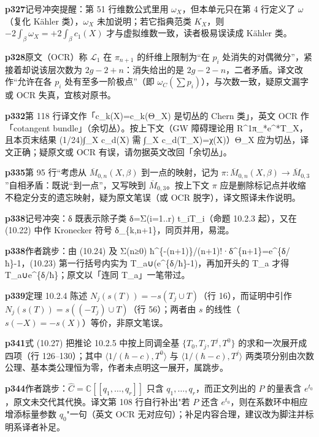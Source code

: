 \noindent\textbf{\footnotesize p327}\quad 记号冲突提醒：第 51 行维数公式里用 $\omega_X$，但本单元只在第 4 行定义了 $\omega$（复化 Kähler 类），$\omega_X$ 未加说明；若它指典范类 $K_X$，则 $-2\int_\beta\omega_X=+2\int_\beta c_1(X)$ 才与虚拟维数一致，读者极易误读成 Kähler 类。

\noindent\textbf{\footnotesize p328}\quad 原文（OCR）称 $\mathcal L_1$ 在 $\pi_{n+1}$ 的纤维上限制为“在 $p_i$ 处消失的对偶微分”，紧接着却说该层次数为 $2g-2+n$：消失给出的是 $2g-2-n$，二者矛盾。译文改作“允许在各 $p_i$ 处有至多一阶极点”（即 $\omega_C(\sum p_i)$），与次数一致，疑原文漏字或 OCR 失真，宜核对原书。

\noindent\textbf{\footnotesize p332}\quad 第 118 行译文作「c\_k(X)=c\_k(Θ\_X) 是切丛的 Chern 类」，英文 OCR 作「cotangent bundle」（余切丛）。按上下文（GW 障碍理论用 R\^{}1π\_*e\^{}*T\_X，且本页末结果 (1/24)∫\_X c\_d(X) 需 ∫\_X c\_d(T\_X)=χ(X)）Θ\_X 应为切丛，译文正确；疑原文或 OCR 有误，请勿据英文改回「余切丛」。

\noindent\textbf{\footnotesize p335}\quad 第 95 行“考虑从 $\overline M_{0,n}(X,\beta)$ 到一点的映射，记为 $\pi:\overline M_{0,n}(X,\beta)\to\overline M_{0,3}$”自相矛盾：既说“到一点”，又写映到 $\overline M_{0,3}$。按上下文 $\pi$ 应是删除标记点并收缩不稳定分支的遗忘映射，疑为原文笔误（或 OCR 脱字），译文照译未作说明。

\noindent\textbf{\footnotesize p338}\quad 记号冲突：δ 既表示除子类 δ=Σ(i=1..r) t\_iT\_i（命题 10.2.3 起），又在 (10.22) 中作 Kronecker 符号 δ\_\{k,n+1\}，同页并用，易混。

\noindent\textbf{\footnotesize p338}\quad 作者跳步：由 (10.24) 及 Σ(n≥0) ħ\^{}\{-(n+1)\}/(n+1)!·δ\^{}\{n+1\}=e\^{}\{δ/ħ\}-1，(10.23) 第一行括号内实为 T\_a∪(e\^{}\{δ/ħ\}-1)，再加开头的 T\_a 才得 T\_a∪e\^{}\{δ/ħ\}；原文以「连同 T\_a」一笔带过。

\noindent\textbf{\footnotesize p339}\quad 定理 10.2.4 陈述 $N_j(s(T))=-s(T_j\cup T)$（行 16），而证明中引作 $N_j(s(T))=s((-T_j)\cup T)$（行 56）；两者由 $s$ 的线性（$s(-X)=-s(X)$）等价，非原文笔误。

\noindent\textbf{\footnotesize p341}\quad 式 (10.27) 把推论 10.2.5 中按上同调全基 $\{T_0,T_j,T^j,T^0\}$ 的求和一次展开成四项（行 126–130）；其中 $\langle 1/(\hbar-c),T^0\rangle$ 与 $\langle 1/(\hbar-c),T^j\rangle$ 两类项分别由次数公理、基本类公理恒为零，作者未点明这一展开，属跳步。

\noindent\textbf{\footnotesize p344}\quad 作者跳步：$\widehat C=\mathbb C[[q_1,\dots,q_r]]$ 只含 $q_1,\dots,q_r$，而正文列出的 $P$ 的量表含 $e^{t_0}$，原文未交代其代换。译文第 108 行自行补出"若 $P$ 还含 $e^{t_0}$，则在系数环中相应增添标量参数 $q_0$"一句（英文 OCR 无对应句）；补足内容合理，建议改为脚注并标明系译者补足。

